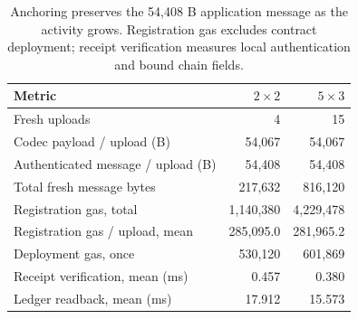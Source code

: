 \begin{table}[!htb]\centering\small
\caption{Anchoring preserves the 54,408 B application message as the activity grows. Registration gas excludes contract deployment; receipt verification measures local authentication and bound chain fields.}\label{tab:chaincost}
\setlength{\tabcolsep}{5pt}
\begin{tabular}{lrr}\toprule
Metric & $2\times2$ & $5\times3$\\\midrule
Fresh uploads & 4 & 15\\
Codec payload / upload (B) & 54,067 & 54,067\\
Authenticated message / upload (B) & 54,408 & 54,408\\
Total fresh message bytes & 217,632 & 816,120\\
Registration gas, total & 1,140,380 & 4,229,478\\
Registration gas / upload, mean & 285,095.0 & 281,965.2\\
Deployment gas, once & 530,120 & 601,869\\
Receipt verification, mean (ms) & 0.457 & 0.380\\
Ledger readback, mean (ms) & 17.912 & 15.573\\\bottomrule
\end{tabular}
\end{table}
